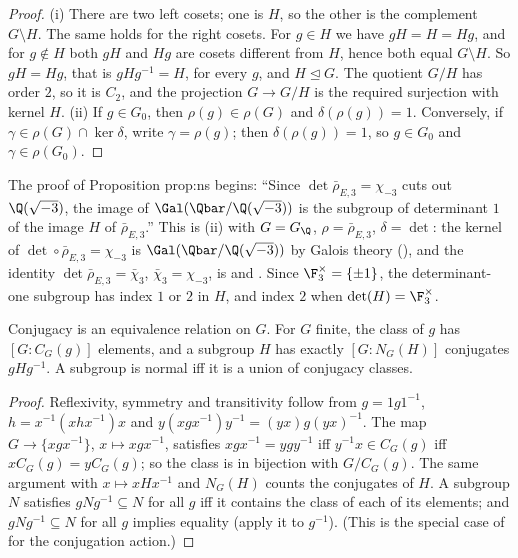 \begin{proof}
(i) There are two left cosets; one is $H$, so the other is the complement $G\setminus H$. The same holds for the right cosets. For $g\in H$ we have
$gH=H=Hg$, and for $g\notin H$ both $gH$ and $Hg$ are cosets different from $H$, hence both equal $G\setminus H$. So $gH=Hg$, that is $gHg^{-1}=H$, for every $g$,
and $H\trianglelefteq G$. The quotient $G/H$ has order $2$, so it is $C_2$, and the projection $G\to G/H$ is the required surjection with kernel $H$. (ii) If $g\in G_0$, then $\rho(g)\in\rho(G)$ and $\delta(\rho(g))=1$. Conversely, if $\gamma\in\rho(G)\cap\ker\delta$, write $\gamma=\rho(g)$; then
$\delta(\rho(g))=1$, so $g\in G_0$ and $\gamma\in\rho(G_0)$.
\end{proof}

\begin{paperlink}
The proof of Proposition prop:ns begins: ``Since $\det\bar\rho_{E,3}=\chi_{-3}$ cuts out $\Q(\sqrt{-3})$, the image of
$\Gal(\Qbar/\Q(\sqrt{-3}))$ is the subgroup of determinant $1$ of the image $H$ of $\bar\rho_{E,3}$.'' This is (ii)
with $G=G_\Q$, $\rho=\bar\rho_{E,3}$, $\delta=\det$: the kernel of $\det\circ\bar\rho_{E,3}=\chi_{-3}$ is $\Gal(\Qbar/\Q(\sqrt{-3}))$ by Galois theory
(), and the identity $\det\bar\rho_{E,3}=\bar\chi_3$, $\bar\chi_3=\chi_{-3}$, is  and .
Since $\F_3^\times=\{\pm1\}$, the determinant-one subgroup has index $1$ or $2$ in $H$, and index $2$ when $\det(H)=\F_3^\times$.
\end{paperlink}

\begin{proposition}\label{prop:groups:conjclasses}
Conjugacy is an equivalence relation on $G$. For $G$ finite, the class of $g$ has $[G:C_G(g)]$ elements, and a subgroup $H$ has
exactly $[G:N_G(H)]$ conjugates $gHg^{-1}$. A subgroup is normal iff it is a union of conjugacy classes.
\end{proposition}

\begin{proof}
Reflexivity, symmetry and transitivity follow from $g=1g1^{-1}$, $h=x^{-1}(xhx^{-1})x$ and $y(xgx^{-1})y^{-1}=(yx)g(yx)^{-1}$. The map
$G\to\{xgx^{-1}\}$, $x\mapsto xgx^{-1}$, satisfies $xgx^{-1}=ygy^{-1}$ iff $y^{-1}x\in C_G(g)$ iff $xC_G(g)=yC_G(g)$; so the class is in bijection
with $G/C_G(g)$. The same argument with $x\mapsto xHx^{-1}$ and $N_G(H)$ counts the conjugates of $H$. A subgroup $N$ satisfies
$gNg^{-1}\subseteq N$ for all $g$ iff it contains the class of each of its elements; and $gNg^{-1}\subseteq N$ for all $g$ implies equality (apply it to
$g^{-1}$). (This is the special case of  for the conjugation action.)
\end{proof}

